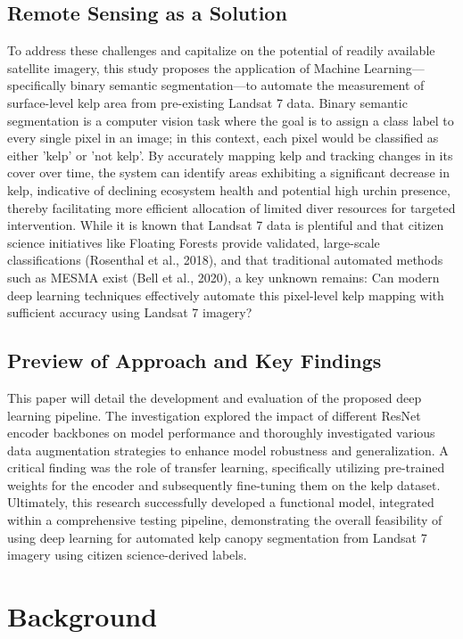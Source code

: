 \documentclass{article}
\begin{document}
\subsection{Remote Sensing as a Solution} 

To address these challenges and capitalize on the potential of readily available satellite imagery, this study proposes the application of Machine Learning—specifically binary semantic segmentation—to automate the measurement of surface-level kelp area from pre-existing Landsat 7 data. Binary semantic segmentation is a computer vision task where the goal is to assign a class label to every single pixel in an image; in this context, each pixel would be classified as either 'kelp' or 'not kelp'. By accurately mapping kelp and tracking changes in its cover over time, the system can identify areas exhibiting a significant decrease in kelp, indicative of declining ecosystem health and potential high urchin presence, thereby facilitating more efficient allocation of limited diver resources for targeted intervention. While it is known that Landsat 7 data is plentiful and that citizen science initiatives like Floating Forests provide validated, large-scale classifications (Rosenthal et al., 2018), and that traditional automated methods such as MESMA exist (Bell et al., 2020), a key unknown remains: Can modern deep learning techniques effectively automate this pixel-level kelp mapping with sufficient accuracy using Landsat 7 imagery? 


\subsection{Preview of Approach and Key Findings} 

This paper will detail the development and evaluation of the proposed deep learning pipeline. The investigation explored the impact of different ResNet encoder backbones on model performance and thoroughly investigated various data augmentation strategies to enhance model robustness and generalization. A critical finding was the role of transfer learning, specifically utilizing pre-trained weights for the encoder and subsequently fine-tuning them on the kelp dataset. Ultimately, this research successfully developed a functional model, integrated within a comprehensive testing pipeline, demonstrating the overall feasibility of using deep learning for automated kelp canopy segmentation from Landsat 7 imagery using citizen science-derived labels.

\section{Background}
\end{document}
